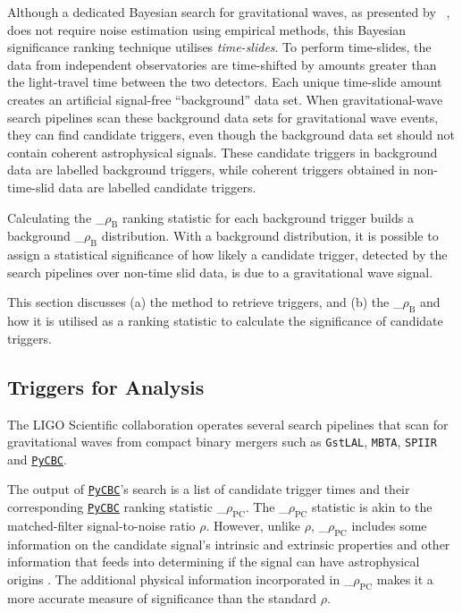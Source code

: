 \documentclass[%
 amsmath,amssymb,
 aps,
twocolumn
]{revtex4}
\newcommand{\pycbc}{{\sc \href{https://pycbc.org/}{\texttt{PyCBC}}}\xspace}
\newcommand{\mathcmd}[1]{{\sc \relax\ifmmode#1\else $#1$\fi}\xspace}
\newcommand{\bcr}{\mathcmd{\rho_\text{B}}}
\newcommand{\pycbcstat}{\mathcmd{\rho_\text{PC}}}
\newcommand{\snr}{\mathcmd{\rho}}
\begin{document}
Although a dedicated Bayesian search for gravitational waves, as presented by ~\cite{BCR2}, does not require noise estimation using empirical methods, this Bayesian significance ranking technique utilises \textit{time-slides}. To perform time-slides, the data from independent observatories are time-shifted by amounts greater than the light-travel time between the two detectors. Each unique time-slide amount creates an artificial signal-free ``background'' data set. When gravitational-wave search pipelines scan these background data sets for gravitational wave events, they can find candidate triggers, even though the background data set should not contain coherent astrophysical signals. These candidate triggers in background data are labelled background triggers, while coherent triggers obtained in non-time-slid data are labelled candidate triggers.

Calculating the \bcr ranking statistic for each background trigger builds a background \bcr distribution. With a background distribution,  it is possible to assign a statistical significance of how likely a candidate trigger, detected by the search pipelines over non-time slid data, is due to a gravitational wave signal. 

This section discusses (a) the method to retrieve triggers, and (b) the \bcr and how it is utilised as a ranking statistic to calculate the significance of candidate triggers.


\subsection{Triggers for Analysis}

The LIGO Scientific collaboration operates several search pipelines that scan for gravitational waves from compact binary mergers such as \texttt{GstLAL}, \texttt{MBTA}, \texttt{SPIIR} and \pycbc \cite{abbott2019gwtc}.

The output of \pycbc's search is a list of candidate trigger times and their corresponding \pycbc ranking statistic \pycbcstat. The \pycbcstat statistic is akin to the matched-filter signal-to-noise ratio \snr. However, unlike \snr, \pycbcstat includes some information on the candidate signal's intrinsic and extrinsic properties and other information that feeds into determining if the signal can have astrophysical origins \cite{pycbc_og6}. The additional physical information incorporated in \pycbcstat makes it a more accurate measure of significance than the standard \snr. 
\end{document}
